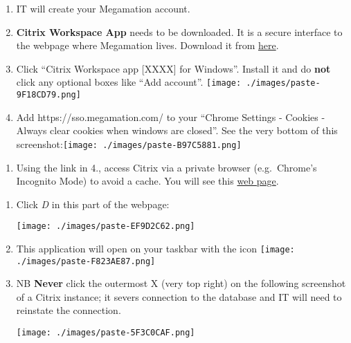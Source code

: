 \documentclass[
  letterpaper,
  DIV=11,
  numbers=noendperiod,
  oneside]{scrreprt}
\providecommand{\tightlist}{%
  \setlength{\itemsep}{0pt}\setlength{\parskip}{0pt}}\usepackage{longtable,booktabs,array}
\begin{document}
\begin{enumerate}
\def\labelenumi{\arabic{enumi}.}
\item
  IT will create your Megamation account.
\item
  \textbf{Citrix Workspace App} needs to be downloaded. It is a secure
  interface to the webpage where Megamation lives. Download it from
  \href{https://www.citrix.com/downloads/workspace-app/}{here}.
\item
  Click ``Citrix Workspace app {[}XXXX{]} for Windows''. Install it and
  do \textbf{not} click any optional boxes like ``Add account''.
  \texttt{[image: ./images/paste-9F18CD79.png]}
\item
  Add https://sso.megamation.com/ to your ``Chrome Settings - Cookies -
  Always clear cookies when windows are closed''. See the very bottom of
  this screenshot:\texttt{[image: ./images/paste-B97C5881.png]}
\end{enumerate}

{}

\begin{enumerate}
\def\labelenumi{\arabic{enumi}.}
\setcounter{enumi}{4}
\tightlist
\item
  Using the link in 4., access Citrix via a private browser
  (e.g.~Chrome's Incognito Mode) to avoid a cache. You will see this
  \href{https://sso.megamation.com/uog}{web page}.
\end{enumerate}

{}

\begin{enumerate}
\def\labelenumi{\arabic{enumi}.}
\setcounter{enumi}{5}
\item
  Click \emph{D} in this part of the webpage:

  \texttt{[image: ./images/paste-EF9D2C62.png]}
\item
  This application will open on your taskbar with the icon
  \texttt{[image: ./images/paste-F823AE87.png]}
\item
  NB \textbf{Never} click the outermost X (very top right) on the
  following screenshot of a Citrix instance; it severs connection to the
  database and IT will need to reinstate the connection.

  \texttt{[image: ./images/paste-5F3C0CAF.png]}
\end{enumerate}
\end{document}
